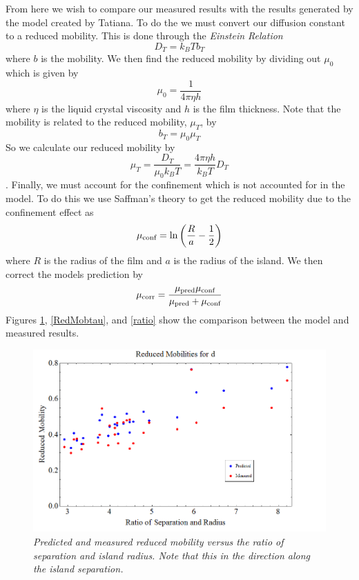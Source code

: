 \documentclass[11pt]{article}
\begin{document}
From here we wish to compare our measured results with the results generated by the model created by Tatiana. To do the we must convert our diffusion constant to a reduced mobility. This is done through the \emph{Einstein Relation}
\begin{equation}
D_T = k_BTb_T
\end{equation}
where $b$ is the mobility. We then find the reduced mobility by dividing out $\mu_0$ which is given by
$$\mu_0 = \frac{1}{4\pi\eta h}$$
where $\eta$ is the liquid crystal viscosity and $h$ is the film thickness. Note that the mobility is related to the reduced mobility, $\mu_T$, by
$$b_T = \mu_0\mu_T$$
So we calculate our reduced mobility by
$$\mu_T = \frac{D_T}{\mu_0k_BT} = \frac{4\pi\eta h}{k_BT}D_T$$.
Finally, we must account for the confinement which is not accounted for in the model. To do this we use Saffman's theory to get the reduced mobility due to the confinement effect as
$$\mu_{\textnormal{conf}} = \ln\left(\frac{R}{a}-\frac{1}{2}\right)$$
where $R$ is the radius of the film and $a$ is the radius of the island. We then correct the models prediction by 
$$\mu_{\textnormal{corr}} = \frac{\mu_{\textnormal{pred}}\mu_{\textnormal{conf}}}{\mu_{\textnormal{pred}}+\mu_{\textnormal{conf}}}$$
Figures \ref{RedMobd}, \ref{RedMobtau}, and \ref{ratio} show the comparison between the model and measured results.

\begin{figure}
\centering
\includegraphics[scale=0.4]{Images/RedMobd.png}
\caption{\textit{Predicted and measured reduced mobility versus the ratio of separation and island radius. Note that this in the direction along the island separation.}}
\label{RedMobd}
\end{figure}
\end{document}
